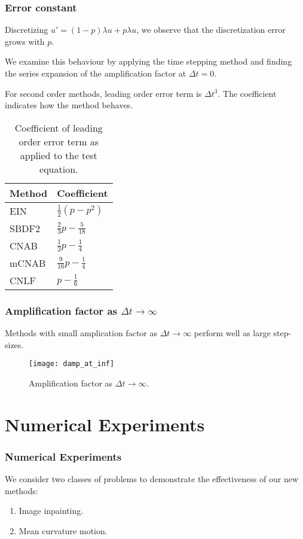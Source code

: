 \documentclass[hyperref={pdfpagelabels=false}]{beamer}
\begin{document}
\begin{frame}
	\frametitle{Error constant}
Discretizing $u' = (1- p)\lambda u + p\lambda u$, we observe that the discretization error grows with $p$.

We examine this behaviour by applying the time stepping method and finding the series expansion of the amplification factor at $\Delta t=0$. 

For second order methods, leading order error term is $\Delta t^3$. The coefficient indicates how the method behaves. 
\vspace{-11pt}
\begin{table}[b]
	\centering 
	\caption{Coefficient of leading order error term as applied to the test equation.}
\renewcommand{\arraystretch}{1.10}
	\begin{tabular}{ll} 
		\toprule 
Method & Coefficient 
\\ \midrule 
EIN & $\frac{1}{2}(p-p^2)$ 
\\
SBDF2 & $\frac{2}{3}p - \frac{5}{18}$
\\ 
CNAB & $\frac{1}{2}p-\frac{1}{4}$
\\ 
mCNAB & $\frac{9}{16}p - \frac{1}{4}$
\\ 
CNLF & $p-\frac{1}{6}$
\\ \bottomrule
		\end{tabular}
	\end{table}
\end{frame}

\begin{frame}
	\frametitle{Amplification factor as $\Delta t\to\infty$}
Methods with small amplication factor as $\Delta t \to \infty$ perform well as large step-sizes. 
\vspace{-5pt}
\begin{figure}
	\centering 
	\texttt{[image: damp\_at\_inf]}
	\caption{Amplification factor as $\Delta t \to \infty$.}
\end{figure}
\end{frame}

\section{Numerical Experiments}
\begin{frame}
        \frametitle{Numerical Experiments} 
We consider two classes of problems to demonstrate the effectiveness of our new methods: 
\begin{enumerate}
        \item Image inpainting.
	\item Mean curvature motion.
\end{enumerate}

\end{frame}
\end{document}
